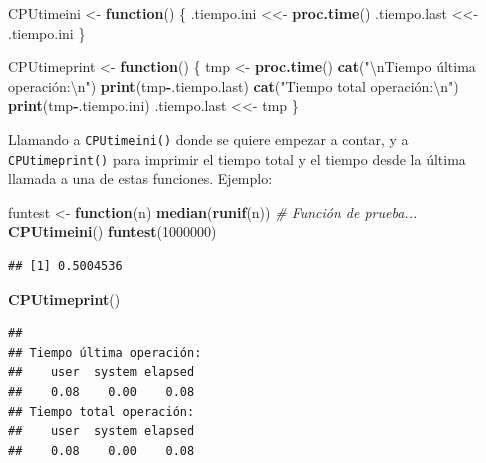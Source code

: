 \documentclass[]{book}
\newenvironment{Shaded}{\begin{snugshade}}{\end{snugshade}}
\newcommand{\KeywordTok}[1]{\textcolor[rgb]{0.13,0.29,0.53}{\textbf{#1}}}
\newcommand{\DecValTok}[1]{\textcolor[rgb]{0.00,0.00,0.81}{#1}}
\newcommand{\CharTok}[1]{\textcolor[rgb]{0.31,0.60,0.02}{#1}}
\newcommand{\StringTok}[1]{\textcolor[rgb]{0.31,0.60,0.02}{#1}}
\newcommand{\CommentTok}[1]{\textcolor[rgb]{0.56,0.35,0.01}{\textit{#1}}}
\newcommand{\ControlFlowTok}[1]{\textcolor[rgb]{0.13,0.29,0.53}{\textbf{#1}}}
\newcommand{\OperatorTok}[1]{\textcolor[rgb]{0.81,0.36,0.00}{\textbf{#1}}}
\newcommand{\NormalTok}[1]{#1}
\theoremstyle{definition}
\theoremstyle{definition}
\theoremstyle{definition}
\theoremstyle{remark}
\begin{document}
\begin{Shaded}
\begin{Highlighting}[]
\NormalTok{CPUtimeini <-}\StringTok{ }\ControlFlowTok{function}\NormalTok{() \{}
\NormalTok{  .tiempo.ini <<-}\StringTok{ }\KeywordTok{proc.time}\NormalTok{()}
\NormalTok{  .tiempo.last <<-}\StringTok{ }\NormalTok{.tiempo.ini}
\NormalTok{\}}

\NormalTok{CPUtimeprint <-}\StringTok{ }\ControlFlowTok{function}\NormalTok{() \{}
\NormalTok{  tmp <-}\StringTok{ }\KeywordTok{proc.time}\NormalTok{()}
  \KeywordTok{cat}\NormalTok{(}\StringTok{"}\CharTok{\textbackslash{}n}\StringTok{Tiempo última operación:}\CharTok{\textbackslash{}n}\StringTok{"}\NormalTok{)}
  \KeywordTok{print}\NormalTok{(tmp}\OperatorTok{-}\NormalTok{.tiempo.last)}
  \KeywordTok{cat}\NormalTok{(}\StringTok{"Tiempo total operación:}\CharTok{\textbackslash{}n}\StringTok{"}\NormalTok{)}
  \KeywordTok{print}\NormalTok{(tmp}\OperatorTok{-}\NormalTok{.tiempo.ini)}
\NormalTok{  .tiempo.last <<-}\StringTok{ }\NormalTok{tmp}
\NormalTok{\}}
\end{Highlighting}
\end{Shaded}

Llamando a \texttt{CPUtimeini()} donde se quiere empezar a contar, y a
\texttt{CPUtimeprint()} para imprimir el tiempo total y el tiempo desde
la última llamada a una de estas funciones. Ejemplo:

\begin{Shaded}
\begin{Highlighting}[]
\NormalTok{funtest <-}\StringTok{ }\ControlFlowTok{function}\NormalTok{(n) }\KeywordTok{median}\NormalTok{(}\KeywordTok{runif}\NormalTok{(n)) }\CommentTok{# Función de prueba...}
\KeywordTok{CPUtimeini}\NormalTok{()}
\KeywordTok{funtest}\NormalTok{(}\DecValTok{1000000}\NormalTok{)}
\end{Highlighting}
\end{Shaded}

\begin{verbatim}
## [1] 0.5004536
\end{verbatim}

\begin{Shaded}
\begin{Highlighting}[]
\KeywordTok{CPUtimeprint}\NormalTok{()}
\end{Highlighting}
\end{Shaded}

\begin{verbatim}
## 
## Tiempo última operación:
##    user  system elapsed 
##    0.08    0.00    0.08 
## Tiempo total operación:
##    user  system elapsed 
##    0.08    0.00    0.08
\end{verbatim}
\end{document}
